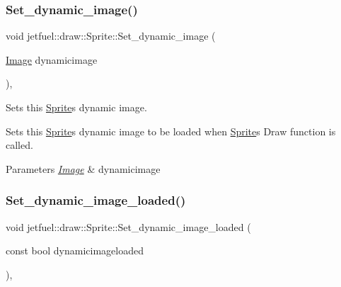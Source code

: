 \subsubsection{\texorpdfstring{Set\+\_\+dynamic\+\_\+image()}{Set\_dynamic\_image()}}
{\footnotesize\ttfamily void jetfuel\+::draw\+::\+Sprite\+::\+Set\+\_\+dynamic\+\_\+image (\begin{DoxyParamCaption}\item[{\hyperlink{classjetfuel_1_1draw_1_1Image}{Image}}]{dynamicimage }\end{DoxyParamCaption})\hspace{0.3cm}{\ttfamily [inline]}, {\ttfamily [protected]}}



Sets this \hyperlink{classjetfuel_1_1draw_1_1Sprite}{Sprite}\textquotesingle{}s dynamic image. 

Sets this \hyperlink{classjetfuel_1_1draw_1_1Sprite}{Sprite}\textquotesingle{}s dynamic image to be loaded when \hyperlink{classjetfuel_1_1draw_1_1Sprite}{Sprite}\textquotesingle{}s Draw function is called.


\begin{DoxyParams}{Parameters}
{\em \hyperlink{classjetfuel_1_1draw_1_1Image}{Image}} & dynamicimage \\
\hline
\end{DoxyParams}
\mbox{\label{classjetfuel_1_1draw_1_1Sprite_a56b760bfd2717c203c64827128132ef8}} 
\subsubsection{\texorpdfstring{Set\+\_\+dynamic\+\_\+image\+\_\+loaded()}{Set\_dynamic\_image\_loaded()}}
{\footnotesize\ttfamily void jetfuel\+::draw\+::\+Sprite\+::\+Set\+\_\+dynamic\+\_\+image\+\_\+loaded (\begin{DoxyParamCaption}\item[{const bool}]{dynamicimageloaded }\end{DoxyParamCaption})\hspace{0.3cm}{\ttfamily [inline]}, {\ttfamily [protected]}}



